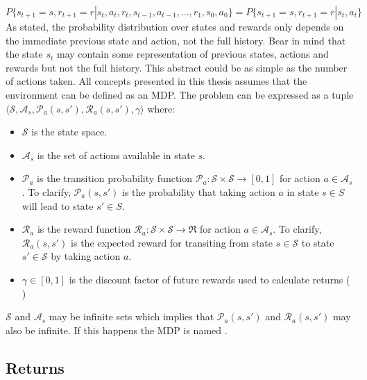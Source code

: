 \begin{equation}
    P \lbrace s_{t+1} = s, r_{t+1} = r | s_t,a_t,r_t,s_{t-1},a_{t-1}, \dots, r_1, s_0, a_0 \rbrace =
    P \lbrace s_{t+1} = s, r_{t+1} = r | s_t,a_t \rbrace
\end{equation}
As stated, the probability distribution over states and rewards only depends on the immediate previous state and action, not the full history. Bear in mind that the state $s_t$ may contain some representation of previous states, actions and rewards but not the full history. This abstract could be as simple as the number of actions taken.
All concepts presented in this thesis assumes that the environment can be defined as an MDP.
The problem can be expressed as a tuple $\langle\mathcal{S}, \mathcal{A}_s,
\mathcal{P}_a(s,s'), \mathcal{R}_a(s,s'), \gamma \rangle$ where:
\begin{itemize}
    \item $\mathcal{S}$ is the state space.
    \item $\mathcal{A}_s$ is the set of actions available in state $s$.
    \item $\mathcal{P}_a$ is the transition probability function
    $\mathcal{P}_a : \mathcal{S} \times \mathcal{S} \rightarrow [0,1]$
    for action $a \in \mathcal{A}_s$ . To clarify, $\mathcal{P}_a(s,s')$
    is the probability that taking action $a$ in state $s \in S$ will lead
    to state $s' ∈ S$.
    \item $\mathcal{R}_a$ is the reward function
    $\mathcal{R}_a : \mathcal{S} \times \mathcal{S} \rightarrow \Re$ for action
    $a \in \mathcal{A}_s$. To clarify, $\mathcal{R}_a(s,s')$ is the expected
    reward for transiting from state $s \in \mathcal{S}$ to state $s' \in \mathcal{S}$
    by taking action $a$.
    \item $\gamma \in [0,1]$ is the discount factor of future rewards used to calculate returns (  )
\end{itemize}

$\mathcal{S}$ and $\mathcal{A}_s$ may be infinite sets which implies that $\mathcal{P}_a(s,s')$ and $\mathcal{R}_a(s,s')$ may
also be infinite. If this happens the MDP is named .

\subsection{Returns\label{subsec:returns}}

